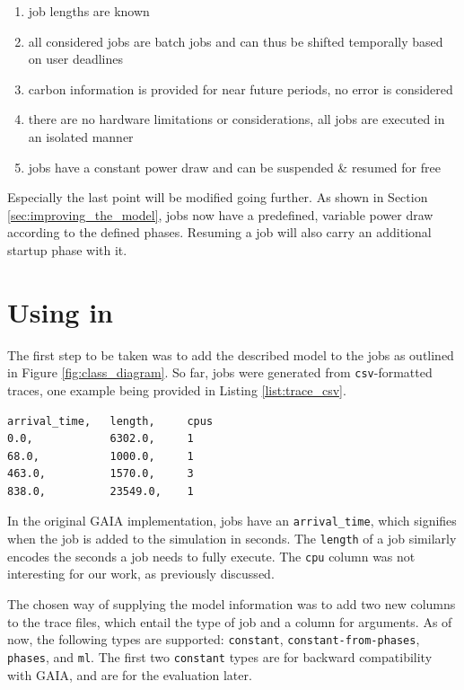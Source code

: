 \begin{enumerate}
    \item job lengths are known
    \item all considered jobs are batch jobs and can thus be shifted temporally based on user deadlines
    \item carbon information is provided for near future periods, no error is considered
    \item there are no hardware limitations or considerations, all jobs are executed in an isolated manner
    \item jobs have a constant power draw and can be suspended \& resumed for free
\end{enumerate}

Especially the last point will be modified going further. As shown in Section \ref{sec:improving_the_model}, jobs now have a predefined, variable power draw according to the defined phases. Resuming a job will also carry an additional startup phase with it.

\section{Using \modelname{} in \programname{}}

The first step to be taken was to add the described model to the jobs as outlined in Figure \ref{fig:class_diagram}. 
So far, jobs were generated from \verb|csv|-formatted traces, one example being provided in Listing \ref{list:trace_csv}.

\begin{minipage}{\linewidth}
\begin{lstlisting}[frame=single, numbers=none, caption={Excerpt from the Alibaba-PAI trace}, label={list:trace_csv}, basicstyle=\ttfamily]
arrival_time,   length,     cpus
0.0,            6302.0,     1
68.0,           1000.0,     1
463.0,          1570.0,     3
838.0,          23549.0,    1
\end{lstlisting}
\end{minipage}

In the original GAIA implementation, jobs have an \verb|arrival_time|, which signifies when the job is added to the simulation in seconds. 
The \verb|length| of a job similarly encodes the seconds a job needs to fully execute. The \verb|cpu| column was not interesting for our work, as previously discussed.

The chosen way of supplying the model information was to add two new columns to the trace files, which entail the type of job and a column for arguments. 
As of now, the following types are supported: \verb|constant|, \verb|constant-from-phases|, \verb|phases|, and \verb|ml|. 
The first two \verb|constant| types are for backward compatibility with GAIA, and are for the evaluation later.

